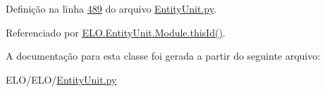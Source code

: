 Definição na linha \hyperlink{EntityUnit_8py_source_l00489}{489} do arquivo \hyperlink{EntityUnit_8py_source}{Entity\-Unit.\-py}.



Referenciado por \hyperlink{classELO_1_1EntityUnit_1_1Module_a7833604c3c13e2fdc5f4bce8712c2118}{E\-L\-O.\-Entity\-Unit.\-Module.\-this\-Id()}.



A documentação para esta classe foi gerada a partir do seguinte arquivo\-:\begin{DoxyCompactItemize}
\item 
E\-L\-O/\-E\-L\-O/\hyperlink{EntityUnit_8py}{Entity\-Unit.\-py}\end{DoxyCompactItemize}
